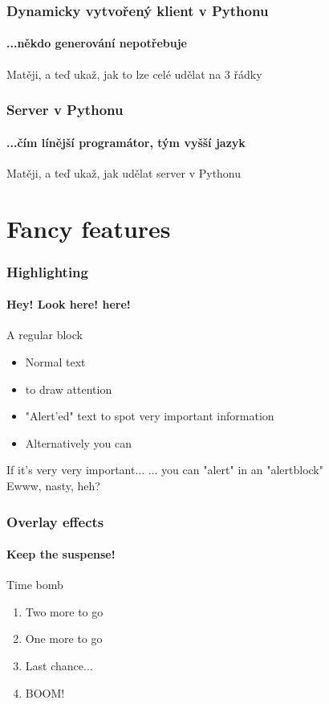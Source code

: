 \documentclass[12pt]{beamer}
\begin{document}
\begin{frame}
  \frametitle{Dynamicky vytvořený klient v Pythonu}
  \framesubtitle{...někdo generování nepotřebuje}

  \begin{example}
    Matěji, a teď ukaž, jak to lze celé udělat na 3 řádky
  \end{example}
\end{frame}

\begin{frame}
  \frametitle{Server v Pythonu}
  \framesubtitle{...čím línější programátor, tým vyšší jazyk}

  \begin{example}
    Matěji, a teď ukaž, jak udělat server v Pythonu
  \end{example}
\end{frame}



\section{Fancy features}
\begin{frame}
  \frametitle{Highlighting}
  \framesubtitle{Hey! Look here! here!}

  \begin{block}{A regular block}
  \begin{itemize}
    \item Normal text
    \item {} to draw attention
    \item \alert{"Alert'ed" text} to spot very important information
    \item Alternatively you can
  \end{itemize}
  \end{block}
  \begin{alertblock}{If it's very very important...}
  \alert{... you can "alert" in an "alertblock"}\\
  Ewww, nasty, heh?
  \end{alertblock}
\end{frame}

\begin{frame}
  \frametitle{Overlay effects}
  \framesubtitle{Keep the suspense!}
  \begin{block}{Time bomb}
  \begin{enumerate}
    \item<2-> Two more to go
    \item<3-> One more to go
    \item<4-> Last chance...
    \item<5-> BOOM!
  \end{enumerate}
  \end{block}
\end{frame}
\end{document}
